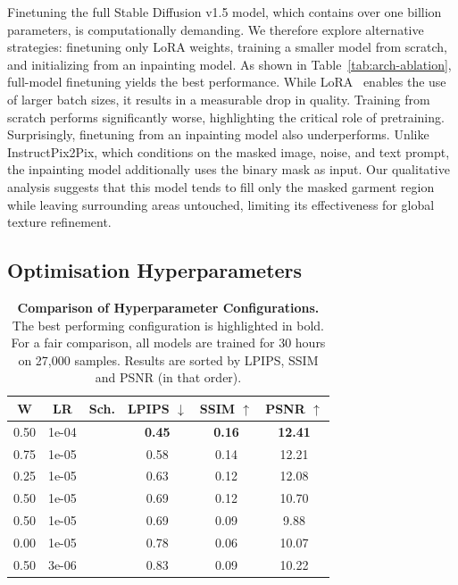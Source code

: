 \documentclass[11pt,twocolumn]{article}
\newcommand{\cmark}{\checkmark}
\newcommand{\xmark}{\ding{55}}
\begin{document}
Finetuning the full Stable Diffusion v1.5 model, which contains over one billion parameters, 
is computationally demanding. We therefore explore alternative strategies: finetuning only LoRA weights, training a smaller model 
from scratch, and initializing from an inpainting model. As shown in Table~\ref{tab:arch-ablation}, full-model finetuning yields 
the best performance. While LoRA~\cite{lora} enables the use of larger batch sizes, 
it results in a measurable drop in quality. Training from scratch performs significantly worse, 
highlighting the critical role of pretraining. Surprisingly, finetuning from an inpainting model also underperforms. 
Unlike InstructPix2Pix, which conditions on the masked image, noise, and text prompt, the inpainting model additionally uses the binary mask as 
input. Our qualitative analysis suggests that this model tends to fill only the masked garment region while leaving 
surrounding areas untouched, limiting its effectiveness for global texture refinement.


\subsection{Optimisation Hyperparameters}

\begin{table}[t]
  \centering
  \begin{tabular}{ccc|ccc}
  \toprule
  \textbf{W} & \textbf{LR} & \textbf{Sch.} & \textbf{LPIPS} $\downarrow$ & \textbf{SSIM} $\uparrow$ & \textbf{PSNR} $\uparrow$ \\
  \midrule
  0.50 & 1e-04 & \xmark & \textbf{0.45} & \textbf{0.16} & \textbf{12.41} \\
  0.75 & 1e-05 & \xmark & 0.58 & 0.14 & 12.21 \\
  0.25 & 1e-05 & \xmark & 0.63 & 0.12 & 12.08 \\
  0.50 & 1e-05 & \cmark & 0.69 & 0.12 & 10.70 \\
  0.50 & 1e-05 & \xmark & 0.69 & 0.09 & 9.88 \\
  0.00 & 1e-05 & \xmark & 0.78 & 0.06 & 10.07 \\
  0.50 & 3e-06 & \xmark & 0.83 & 0.09 & 10.22 \\
  \bottomrule
  \end{tabular}
  \caption{\textbf{Comparison of Hyperparameter Configurations.} 
  The best performing configuration is highlighted in bold. For a 
  fair comparison, all models are trained for 30 hours on 27,000 samples. Results are sorted by LPIPS, SSIM and PSNR (in that order).}
  \label{tab:hyperparams}
\end{table}
\end{document}
